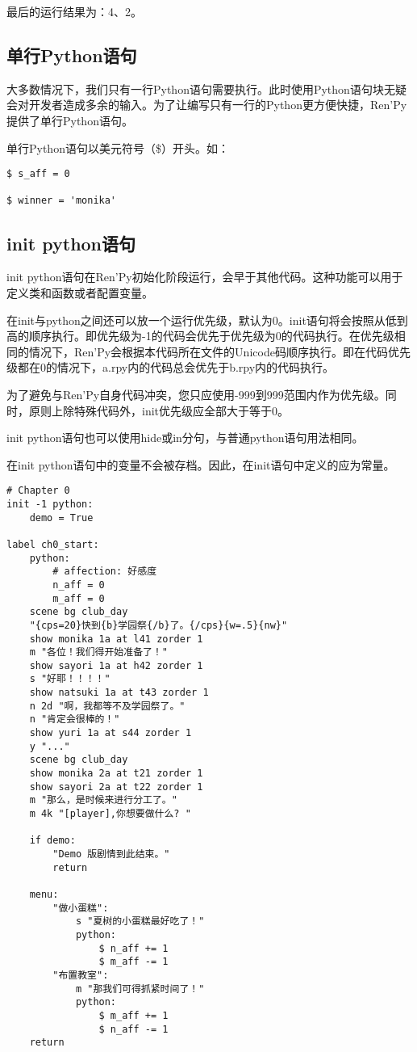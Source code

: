 最后的运行结果为：4、2。

\subsection{单行Python语句}
大多数情况下，我们只有一行Python语句需要执行。此时使用Python语句块无疑会对开发者造成多余的输入。为了让编写只有一行的Python更方便快捷，Ren'Py提供了单行Python语句。

单行Python语句以美元符号（\$）开头。如：
\begin{lstlisting}
$ s_aff = 0

$ winner = 'monika'
\end{lstlisting}

\subsection{init python语句}
init python语句在Ren'Py初始化阶段运行，会早于其他代码。这种功能可以用于定义类和函数或者配置变量。
\begin{ExtraKnowledge}
    在init与python之间还可以放一个运行优先级，默认为0。init语句将会按照从低到高的顺序执行。即优先级为-1的代码会优先于优先级为0的代码执行。在优先级相同的情况下，Ren'Py会根据本代码所在文件的Unicode码顺序执行。即在代码优先级都在0的情况下，a.rpy内的代码总会优先于b.rpy内的代码执行。
\end{ExtraKnowledge}

\begin{Attention}
    为了避免与Ren'Py自身代码冲突，您只应使用-999到999范围内作为优先级。同时，原则上除特殊代码外，init优先级应全部大于等于0。
\end{Attention}

init python语句也可以使用hide或in分句，与普通python语句用法相同。

在init python语句中的变量不会被存档。因此，在init语句中定义的应为常量。

\begin{lstlisting}
# Chapter 0
init -1 python:
    demo = True

label ch0_start:
    python:
        # affection: 好感度
        n_aff = 0
        m_aff = 0
    scene bg club_day
    "{cps=20}快到{b}学园祭{/b}了。{/cps}{w=.5}{nw}"
    show monika 1a at l41 zorder 1
    m "各位！我们得开始准备了！"
    show sayori 1a at h42 zorder 1
    s "好耶！！！！"
    show natsuki 1a at t43 zorder 1
    n 2d "啊，我都等不及学园祭了。"
    n "肯定会很棒的！"
    show yuri 1a at s44 zorder 1
    y "..."
    scene bg club_day
    show monika 2a at t21 zorder 1
    show sayori 2a at t22 zorder 1
    m "那么，是时候来进行分工了。"
    m 4k "[player],你想要做什么? "

    if demo:
        "Demo 版剧情到此结束。"
        return

    menu:
        "做小蛋糕":
            s "夏树的小蛋糕最好吃了！"
            python:
                $ n_aff += 1
                $ m_aff -= 1
        "布置教室":
            m "那我们可得抓紧时间了！"
            python:
                $ m_aff += 1
                $ n_aff -= 1
    return

\end{lstlisting}

